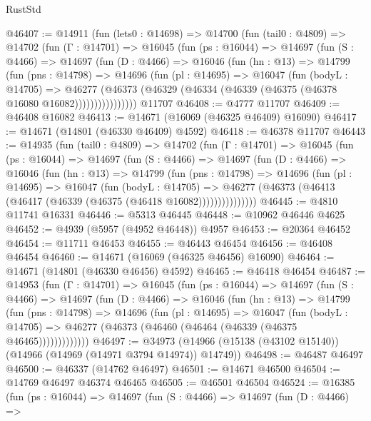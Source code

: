 \begin{lexlean}{RustStd}
\begin{coremodule}
@46407 := @14911
    (fun (lets0 : @14698) =>
    @14700
      (fun (tail0 : @4809) =>
      @14702
        (fun (Γ : @14701) =>
        @16045
          (fun (ps : @16044) =>
          @14697
            (fun (S : @4466) =>
            @14697
              (fun (D : @4466) =>
              @16046
                (fun (hn : @13) =>
                @14799
                  (fun (pns : @14798) =>
                  @14696
                    (fun (pl : @14695) =>
                    @16047
                      (fun (bodyL : @14705) =>
                      @46277
                        (@46373
                          (@46329 (@46334 (@46339 (@46375 (@46378 @16080 @16082))))))))))))))))
    @11707
@46408 := @4777 @11707
@46409 := @46408 @16082
@46413 := @14671 (@16069 (@46325 @46409) @16090)
@46417 := @14671 (@14801 (@46330 @46409) @4592)
@46418 := @46378 @11707
@46443 := @14935
    (fun (tail0 : @4809) =>
    @14702
      (fun (Γ : @14701) =>
      @16045
        (fun (ps : @16044) =>
        @14697
          (fun (S : @4466) =>
          @14697
            (fun (D : @4466) =>
            @16046
              (fun (hn : @13) =>
              @14799
                (fun (pns : @14798) =>
                @14696
                  (fun (pl : @14695) =>
                  @16047
                    (fun (bodyL : @14705) =>
                    @46277 (@46373 (@46413 (@46417 (@46339 (@46375 (@46418 @16082)))))))))))))))
@46445 := @4810 @11741 @16331
@46446 := @5313 @46445
@46448 := @10962 @46446 @4625
@46452 := @4939 (@5957 (@4952 @46448)) @4957
@46453 := @20364 @46452
@46454 := @11711 @46453
@46455 := @46443 @46454
@46456 := @46408 @46454
@46460 := @14671 (@16069 (@46325 @46456) @16090)
@46464 := @14671 (@14801 (@46330 @46456) @4592)
@46465 := @46418 @46454
@46487 := @14953
    (fun (Γ : @14701) =>
    @16045
      (fun (ps : @16044) =>
      @14697
        (fun (S : @4466) =>
        @14697
          (fun (D : @4466) =>
          @16046
            (fun (hn : @13) =>
            @14799
              (fun (pns : @14798) =>
              @14696
                (fun (pl : @14695) =>
                @16047
                  (fun (bodyL : @14705) =>
                  @46277 (@46373 (@46460 (@46464 (@46339 (@46375 @46465)))))))))))))
@46497 := @34973 (@14966 (@15138 (@43102 @15140)) (@14966 (@14969 (@14971 @3794 @14974)) @14749))
@46498 := @46487 @46497
@46500 := @46337 (@14762 @46497)
@46501 := @14671 @46500
@46504 := @14769 @46497 @46374 @46465
@46505 := @46501 @46504
@46524 := @16385
    (fun (ps : @16044) =>
    @14697
      (fun (S : @4466) =>
      @14697
        (fun (D : @4466) =>

\end{coremodule}
\end{lexlean}
